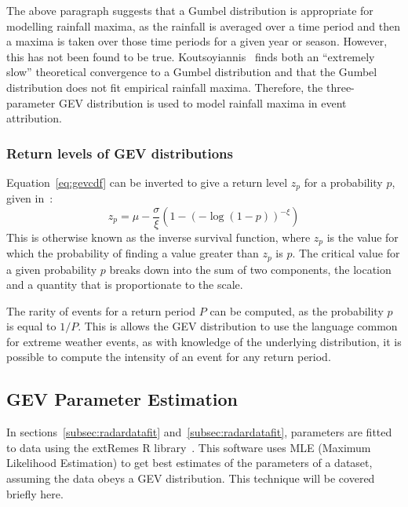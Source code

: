 The above paragraph suggests that a Gumbel distribution is appropriate for modelling rainfall maxima,
    as the rainfall is averaged over a time period and then a maxima is taken over those time periods for a given year or season.
However, this has not been found to be true.
Koutsoyiannis~\cite{Koutsoyiannis_2003} finds both an ``extremely slow'' theoretical convergence to a Gumbel distribution and
    that the Gumbel distribution does not fit empirical rainfall maxima.
Therefore, the three-parameter GEV distribution is used to model rainfall maxima in event attribution.

\subsubsection{Return levels of GEV distributions}

Equation~\ref{eq:gevcdf} can be inverted to give a return level $z_p$ for a probability $p$, given in~\cite{Coles_2001}:
\begin{equation}\label{eq:gevreturn}
    z_p = \mu - \frac{\sigma}{\xi}\left( 1-\left( -\log\left( 1-p \right) \right)^{-\xi} \right)
\end{equation}
This is otherwise known as the inverse survival function,
    where $z_p$ is the value for which the probability of finding a value greater than $z_p$ is $p$.
The critical value for a given probability $p$ breaks down into the sum of two components,
    the location and a quantity that is proportionate to the scale.

The rarity of events for a return period $P$ can be computed,
    as the probability $p$ is equal to $1/P$.
This is allows the GEV distribution to use the language common for extreme weather events,
    as with knowledge of the underlying distribution,
    it is possible to compute the intensity of an event for any return period.

\subsection{GEV Parameter Estimation}\label{subsec:parameterest}

In sections~\ref{subsec:radardatafit} and~\ref{subsec:radardatafit},
    parameters are fitted to data using the extRemes R library~\cite{extremes_R}.
This software uses MLE (Maximum Likelihood Estimation) to get best estimates of the parameters of a dataset,
    assuming the data obeys a GEV distribution.
This technique will be covered briefly here.

